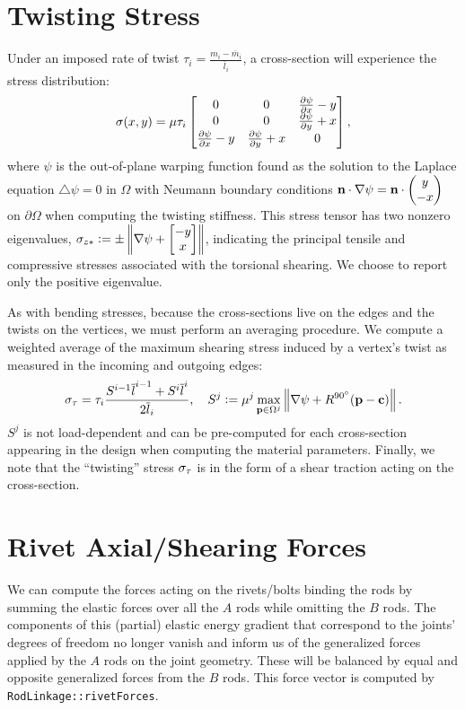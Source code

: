 \documentclass[10pt]{article}
\begin{document}
\section{Twisting Stress}
Under an imposed rate of twist $\tau_i = \frac{m_i - \overline{m}_i}{\overline{l}_i}$, a cross-section will experience the stress distribution:
$$
\sigma(x, y) = \mu \tau_i \begin{bmatrix}
    0 & 0 & \frac{\partial \psi}{\partial x} - y \\
    0 & 0 & \frac{\partial \psi}{\partial y} + x \\
    \frac{\partial \psi}{\partial x} - y & \frac{\partial \psi}{\partial y} + x & 0
\end{bmatrix},
$$
where $\psi$ is the out-of-plane warping function found as the solution to the Laplace equation
$\bigtriangleup \psi = 0$ in $\Omega$ with Neumann boundary conditions ${\bf n} \cdot \nabla \psi = {\bf n} \cdot \begin{pmatrix} y \\ -x \end{pmatrix}$ on $\partial \Omega$
when computing the twisting stiffness.
This stress tensor has two nonzero eigenvalues, $\sigma_{z*} \vcentcolon= \pm \left\|\nabla \psi +
\begin{bmatrix} - y \\ x \end{bmatrix}\right\|$, indicating the principal
tensile and compressive stresses associated with the torsional shearing. We
choose to report only the positive eigenvalue.

As with bending stresses, because the cross-sections live on the edges
and the twists on the vertices, we must perform an averaging procedure. We
compute a weighted average of the maximum shearing stress induced by a vertex's
twist as measured in the incoming and outgoing edges:
$$
\sigma_\tau = \tau_i \frac{S^{i - 1} \overline{l}^{i - 1} + S^i \overline{l}^i}{2 \overline{l}_i},
\quad
S^j \vcentcolon= \mu^{j}\max_{{\bf p} \in \Omega^j} \left\|\nabla \psi + R^{{90}^\circ}({\bf p} - {\bf c}) \right\|.
$$
$S^j$ is not load-dependent and can be pre-computed for each cross-section appearing in the design when computing the
material parameters.
Finally, we note that the ``twisting'' stress $\sigma_\tau$ is in the form of a shear traction acting on the cross-section.

\section{Rivet Axial/Shearing Forces}
We can compute the forces acting on the rivets/bolts binding the rods by summing the elastic forces over all the $A$ rods while
omitting the $B$ rods. The components of this (partial) elastic energy gradient that correspond to the joints'
degrees of freedom no longer vanish and inform us of the generalized
forces applied by the $A$ rods on the joint geometry. These will be balanced
by equal and opposite generalized forces from the $B$ rods. This force vector is computed
by \texttt{RodLinkage::rivetForces}.
\end{document}

